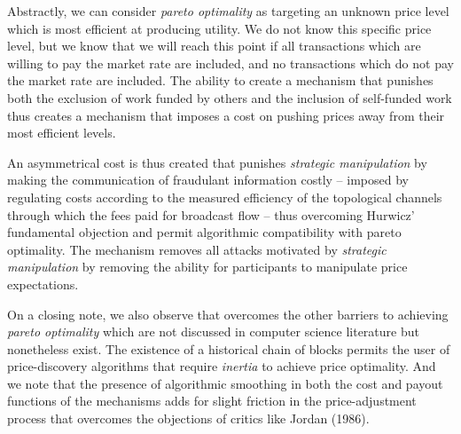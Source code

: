 Abstractly, we can consider \textit{pareto optimality} as targeting an unknown price level which is most efficient at producing utility. We do not know this specific price level, but we know that we will reach this point if all transactions which are willing to pay the market rate are included, and no transactions which do not pay the market rate are included. The ability to create a mechanism that punishes both the exclusion of work funded by others and the inclusion of self-funded work thus creates a mechanism that imposes a cost on pushing prices away from their most efficient levels.

An asymmetrical cost is thus created that punishes \textit{strategic manipulation} by making the communication of fraudulant information costly -- imposed by regulating costs according to the measured efficiency of the topological channels through which the fees paid for broadcast flow -- thus overcoming Hurwicz' fundamental objection and permit algorithmic compatibility with pareto optimality. The mechanism removes all attacks motivated by \textit{strategic manipulation} by removing the ability for participants to manipulate price expectations.

On a closing note, we also observe that \ourTFM overcomes the other barriers to achieving \textit{pareto optimality} which are not discussed in computer science literature but nonetheless exist. The existence of a historical chain of blocks permits the user of price-discovery algorithms that require \textit{inertia} to achieve price optimality. And we note that the presence of algorithmic smoothing in both the cost and payout functions of the mechanisms adds for slight friction in the price-adjustment process that overcomes the objections of critics like Jordan (1986).

